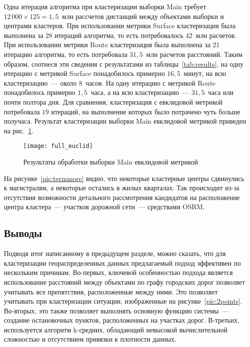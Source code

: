 Одна итерация алгоритма при кластеризации выборки Main требует \( 12\,000 \times 125 = 1,\!5 \)~млн рассчетов дистанций между объектами выборки и центрами кластеров. При использовании метрики Surface кластеризация была выполнена за \( 28 \) итераций алгоритма, то есть потребовалось \( 42 \)~млн расчетов. При использовании метрики Route кластеризация была выполнена за \( 21 \) итерацию алгоритма, то есть потребовала \( 31,\!5 \)~млн расчетов расстояний. Таким образом, соотнеся эти сведения с результатами из таблицы~\ref{tab:results}, на одну итерацию с метрикой Surface понадобилось примерно \( 16,\!5 \)~минут, на всю кластеризацию~--- около \( 8 \)~часов. На одну итерацию с метрикой Route понадобилось примерно \( 1,\!5 \)~часа, а на всю кластеризацию~--- \( 31,\!5 \)~часа или почти полтора дня. Для сравнения, кластеризация с евклидовой метрикой потребовала \( 19 \) итераций, на выполнение которых было потрачено чуть больше получаса. Результат кластеризации выборки Main евклидовой метрикой приведен на рис.~\ref{pic:full-euclid}.
\begin{figure}[h!]
    \centering
    \texttt{[image: full\_euclid]} \\[1ex]
    \parbox{.9\textwidth}{\caption{Результаты обработки выборки Main евклидовой метрикой}\label{pic:full-euclid}}
    \vspace*{-1em}
\end{figure}

На рисунке~\ref{pic:termmore} видно, что некоторые кластерные центры сдвинулись к магистралям, а некоторые остались в жилых кварталах. Так происходит из-за отсутствия возможности детального рассмотрения кандидатов на расположение центра кластера~--- участков дорожной сети~--- средствами OSRM.

\subsection{Выводы} \label{sec:conclusions}
Подводя итог написанному в предыдущем разделе, можно сказать, что для кластеризации геораспределенных данных предлагаемый подход эффективен по нескольким причинам. Во-первых, ключевой особенностью подхода является использование расстояний между объектами по графу городских дорог позволяет учитывать все препятствия, расположенные между ними. Это позволяет учитывать при кластеризации ситуации, изображенные на рисунке~\ref{pic:2points}. Во-вторых, это также позволяет выполнять основную функцию системы~--- создание остановочных пунктов, расположенных на участках дорог. В-третьих, используется алгоритм k-средних, обладающий невысокой вычислительной сложностью и отсутствием привязки к плотности данных.

